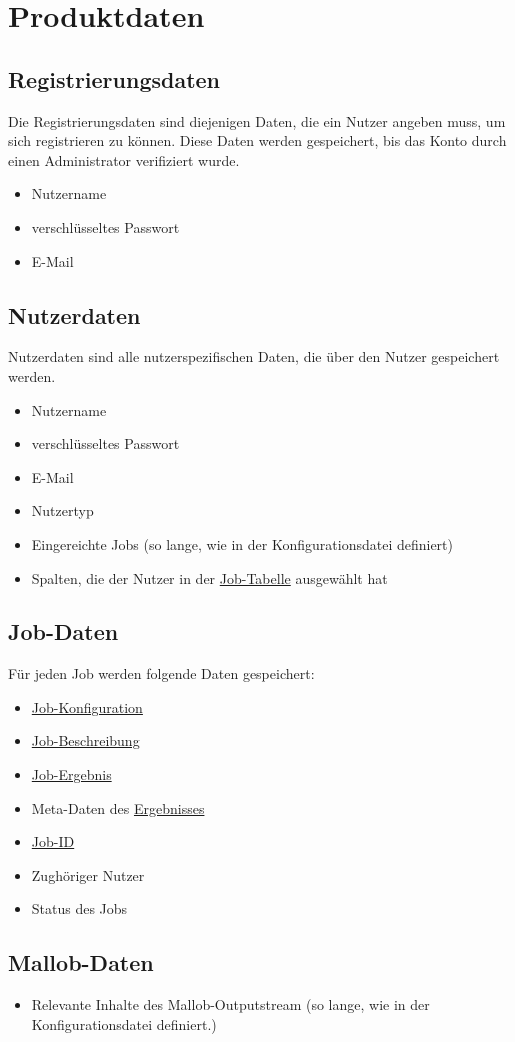 
\section{Produktdaten}
\label{PD}

\label{PD:Registrierungsdaten}
\subsection{Registrierungsdaten}
Die Registrierungsdaten sind diejenigen Daten, die ein Nutzer angeben muss, um sich registrieren zu können. Diese Daten werden gespeichert, bis das Konto durch einen Administrator verifiziert wurde.
\begin{itemize}[noitemsep]
    \item Nutzername
    \item verschlüsseltes Passwort
    \item E-Mail
\end{itemize}

\label{PD:Nutzerdaten}
\subsection{Nutzerdaten}
Nutzerdaten sind alle nutzerspezifischen Daten, die über den Nutzer gespeichert werden.
\begin{itemize}[noitemsep]
    \item Nutzername
    \item verschlüsseltes Passwort
    \item E-Mail
    \item Nutzertyp
    \item Eingereichte Jobs (so lange, wie in der Konfigurationsdatei definiert)
    \item Spalten, die der Nutzer in der \hyperref[pages:job-table]{Job-Tabelle} ausgewählt hat
\end{itemize}



\subsection{Job-Daten}
Für jeden Job werden folgende Daten gespeichert:
\begin{itemize}[noitemsep]
    \item \hyperref[B:Job-Konfiguration]{Job-Konfiguration}
    \item \hyperref[B:Job-Beschreibung]{Job-Beschreibung}
    \item \hyperref[B:Job-Ergebnis]{Job-Ergebnis}
    \item Meta-Daten des \hyperref[B:Job-Ergebnis]{Ergebnisses}
    \item \hyperref[B:Job-ID]{Job-ID}
    \item Zughöriger Nutzer
    \item Status des Jobs
\end{itemize}

\subsection{Mallob-Daten}
\begin{itemize}
    \item Relevante Inhalte des Mallob-Outputstream (so lange, wie in der Konfigurationsdatei definiert.)
\end{itemize}
